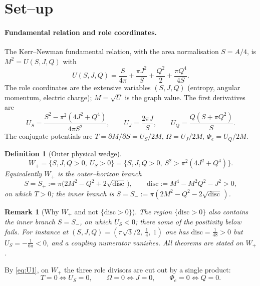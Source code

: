 \documentclass[11pt]{article}
\newtheorem{definition}[theorem]{Definition}
\newtheorem{remark}[theorem]{Remark}
\newcommand{\Wp}{W_{+}}
\newcommand{\Sp}{S_{+}}
\newcommand{\Sm}{S_{-}}
\begin{document}
\section{Set--up}
\label{sec:setup}

\paragraph{Fundamental relation and role coordinates.}
The Kerr--Newman fundamental relation, with the area normalisation $S=A/4$, is $M^2=U(S,J,Q)$
with
\begin{equation}
U(S,J,Q)=\frac{S}{4\pi}+\frac{\pi J^2}{S}+\frac{Q^2}{2}+\frac{\pi Q^4}{4S}.
\label{eq:U}
\end{equation}
The role coordinates are the extensive variables $(S,J,Q)$ (entropy, angular momentum,
electric charge); $M=\sqrt U$ is the graph value. The first derivatives are
\begin{equation}
U_S=\frac{S^2-\pi^2(4J^2+Q^4)}{4\pi S^2},\qquad
U_J=\frac{2\pi J}{S},\qquad
U_Q=\frac{Q(S+\pi Q^2)}{S}.
\label{eq:U1}
\end{equation}
The conjugate potentials are $T=\partial M/\partial S=U_S/2M$, $\Omega=U_J/2M$,
$\Phi_e=U_Q/2M$.

\begin{definition}[Outer physical wedge]
\label{def:wedge}
\[
\Wp=\{S,J,Q>0,\ U_S>0\}=\{S,J,Q>0,\ S^2>\pi^2(4J^2+Q^4)\}.
\]
Equivalently $\Wp$ is the outer--horizon branch
\[
S=\Sp:=\pi\big(2M^2-Q^2+2\sqrt{\mathrm{disc}}\,\big),\qquad
\mathrm{disc}:=M^4-M^2Q^2-J^2>0,
\]
on which $T>0$; the inner branch is $S=\Sm:=\pi(2M^2-Q^2-2\sqrt{\mathrm{disc}}\,)$.
\end{definition}

\begin{remark}[Why $\Wp$ and not $\{\mathrm{disc}>0\}$]
\label{rem:domain}
The region $\{\mathrm{disc}>0\}$ also contains the inner branch $S=\Sm$, on which $U_S<0$;
there some of the positivity below fails. For instance at $(S,J,Q)=(\pi\sqrt3/2,\ \tfrac14,\ 1)$
one has $\mathrm{disc}=\tfrac1{48}>0$ but $U_S=-\tfrac1{6\pi}<0$, and a coupling numerator
vanishes. All theorems are stated on $\Wp$.
\end{remark}

By \eqref{eq:U1}, on $\Wp$ the three role divisors are cut out by a single product:
\begin{equation}
T=0\iff U_S=0,\qquad \Omega=0\iff J=0,\qquad \Phi_e=0\iff Q=0.
\label{eq:divisors}
\end{equation}
\end{document}
